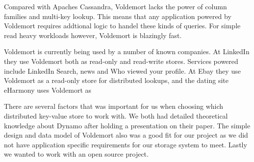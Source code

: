 Compared with Apaches Cassandra, Voldemort lacks the power of column families and multi-key lookup. This means that any application powered by Voldemort requires addtional logic to handel these kinds of queries. For simple read heavy workloads however, Voldemort is blazingly fast. 

Voldemort is currently being used by a number of known companies. At LinkedIn they use Voldemort both as read-only and read-write stores. Services powered include LinkedIn Search, news and Who viewed your profile. At Ebay they use Voldemort as a read-only store for distributed lookups, and the dating site eHarmony uses Voldemort as 

There are several factors that was important for us when choosing which distributed key-value store to work with. We both had detailed theoretical knowledge about Dynamo after holding a presentation on their paper. The simple design and data model of Voldemort also was a good fit for our project as we did not have application specific requirements for our storage system to meet. Lastly we wanted to work with an open source project.









